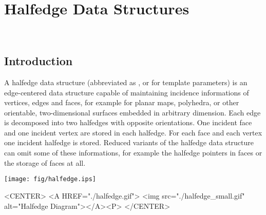 
\ccParDims

\chapter{Halfedge Data Structures}
\label{chapterHalfedgeDS}
\\


\section{Introduction}

A halfedge data structure (abbreviated as , or
 for template parameters) is an edge-centered data structure
capable of maintaining incidence informations of vertices, edges and
faces, for example for planar maps, polyhedra, or other orientable,
two-dimensional surfaces embedded in arbitrary dimension. Each edge is
decomposed into two halfedges with opposite orientations. One incident
face and one incident vertex are stored in each halfedge.  For each
face and each vertex one incident halfedge is stored.  Reduced
variants of the halfedge data structure can omit some of these
informations, for example the halfedge pointers in faces or the
storage of faces at all.

\begin{ccTexOnly}
    \vspace{-4mm}
    \begin{center}
      \parbox{0.4\textwidth}{%
          \texttt{[image: fig/halfedge.ips]}%
      }
    \end{center}
    \vspace{-3mm}
\end{ccTexOnly}

\begin{ccHtmlOnly}
    <CENTER>
    <A HREF="./halfedge.gif">
        <img src="./halfedge_small.gif" alt="Halfedge Diagram"></A><P>
    </CENTER>
\end{ccHtmlOnly}

